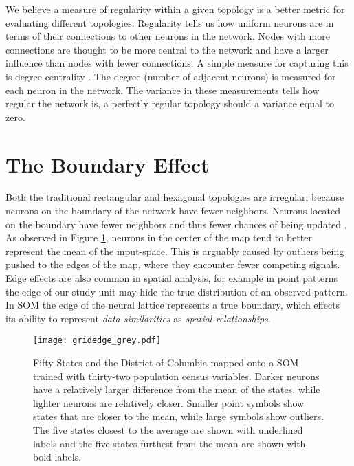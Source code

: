 We believe a measure of regularity within a given topology is a better metric
for evaluating different topologies. Regularity tells us how uniform neurons
are in terms of their connections to other neurons in the network. Nodes with
more connections are thought to be more central to the network and have a
larger influence than nodes with fewer connections. A simple measure for
capturing this is degree centrality \cite{Wasserman:1994}.  The degree (number
of adjacent neurons) is measured for each neuron in the network. The variance
in these measurements tells how regular the network is, a perfectly regular
topology should a variance equal to zero.

\section{The Boundary Effect}
Both the traditional rectangular and hexagonal topologies are irregular,
because neurons on the boundary of the network have fewer neighbors.  Neurons
located on the boundary have fewer neighbors and thus fewer chances of being
updated \citep{wu2006}.  As observed in Figure \ref{figure1}, neurons in the
center of the map tend to better represent the mean of the input-space.  This
is arguably caused by outliers being pushed to the edges of the map, where
they encounter fewer competing signals. 
Edge effects are also common in spatial analysis, for example in point
patterns the edge of our study unit may hide the true distribution of an
observed pattern.  In SOM the edge of the neural lattice represents a true
boundary, which effects its ability to represent \emph{data similarities} as
\emph{spatial relationships}.

\begin{figure}[htb]
\centering
\texttt{[image: gridedge\_grey.pdf]}
\caption{Fifty States and the District of Columbia mapped onto a
SOM trained with thirty-two population census variables.  Darker neurons have a
relatively larger difference from the mean of the states, while lighter
neurons are relatively closer.  Smaller point symbols show states that are closer to the
mean, while large symbols show outliers. The five states closest to the average are shown
with underlined labels and the five states furthest from the mean are shown with
bold labels.}
\label{figure1}
\end{figure}

